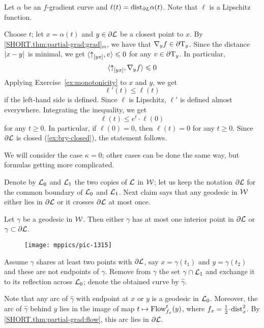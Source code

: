 Let $\alpha$ be an $f$-gradient curve and $\ell(t)=\mathrm{dist}_{\partial L}\alpha(t)$.
Note that $\ell$ is a Lipschitz function.

Choose $t$;
let $x=\alpha(t)$ and $y\in \partial\mathcal{L}$ be a closest point to $x$.
By \ref{SHORT.thm:partial-grad:grad}$_m$, we have that $\nabla_y f\in\partial \mathrm{T}_y$.
Since the distance $\dist{x}{y}{}$ is minimal, 
we get $\langle {\uparrow}_{[{y}{x}]},v\rangle\leqslant 0$ for any $v\in \partial \mathrm{T}_y$.
In particular,
\[\langle {\uparrow}_{[{y}{x}]},\nabla_y f\rangle\leqslant 0\]
Applying Exercise~\ref{ex:monotonicity} to $x$ and $y$, 
we get
\[\ell'(t)\le \ell(t)\]
if the left-hand side is defined.
Since $\ell$ is Lipschitz, $\ell'$ is defined almost everywhere.
Integrating the inequality, we get 
\[\ell(t)\le e^t\cdot\ell(0)\]
for any $t\ge 0$.
In particular, if $\ell(0)=0$, then $\ell(t)=0$ for any $t\ge 0$.
Since $\partial\mathcal{L}$ is closed (\ref{ex:bry-closed}), the statement follows.

We will consider the case $\kappa=0$;
other cases can be done the same way, but formulas getting more complicated.

Denote by $\mathcal{L}_0$ and $\mathcal{L}_1$ the two copies of $\mathcal{L}$ in $\mathcal{W}$;
let us keep the notation $\partial \mathcal{L}$ for the common boundary of $\mathcal{L}_0$ and $\mathcal{L}_1$.
Next claim says that any geodesic in $\mathcal{W}$ either lies in $\partial \mathcal{L}$ or it crosses $\partial \mathcal{L}$ at most once.

\begin{clm}{}
Let $\gamma$ be a geodesic in $\mathcal{W}$.
Then either $\gamma$ has at most one interior point in $\partial \mathcal{L}$ or
$\gamma\subset \partial \mathcal{L}$.
\end{clm}

\begin{wrapfigure}{r}{45mm}
\vskip-2mm
\centering
\texttt{[image: mppics/pic-1315]}
\end{wrapfigure}

Assume $\gamma$ shares at least two points with $\partial \mathcal{L}$, say $x=\gamma(t_1)$ and $y=\gamma(t_2)$ and these are not endpoints of $\gamma$.
Remove from $\gamma$ the set $\gamma\cap \mathcal{L}_1$
and exchange it to its reflection across $\mathcal{L}_0$;
denote the obtained curve by $\hat\gamma$.

Note that any arc of $\hat\gamma$ with endpoint at $x$ or $y$ is a geodesic in $\mathcal{L}_0$.
Moreover, the arc of $\hat\gamma$ behind $y$ lies in the image of map $t\mapsto \mathop{\rm Flow}\nolimits^t_{f_x}(y)$, where $f_x=\tfrac12\cdot\distfun^2_x$.
By \ref{SHORT.thm:partial-grad:flow}, this arc lies in $\partial\mathcal{L}$.

